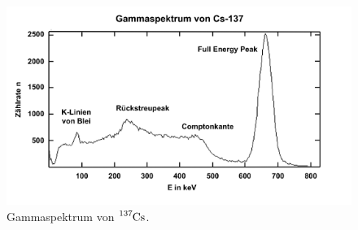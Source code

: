 \begin{figure}[H]
    \centering
    \includegraphics[width=\textwidth]{bilder/LEIFI_Cs_Spektrum.png}
    \caption{Gammaspektrum von $\ce{^{137}Cs}$.\cite{LEIFI}}
    \label{fig:LEIFI_CS_Spektrum}
\end{figure}


% 
